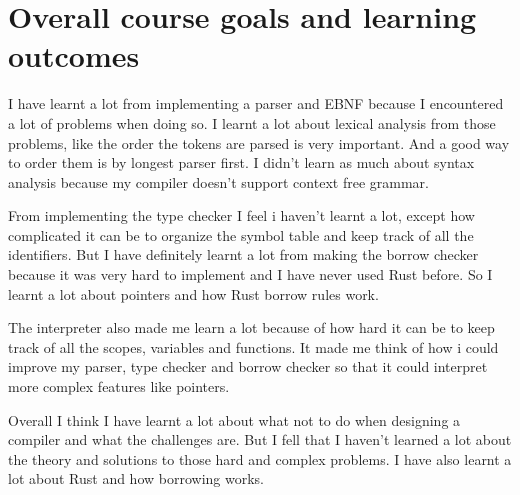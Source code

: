\documentclass[12pt]{article}
\begin{document}
    \section{Overall course goals and learning outcomes}
    	I have learnt a lot from implementing a parser and EBNF because I encountered a lot of problems when doing so. I learnt a lot about lexical analysis from those problems, like the order the tokens are parsed is very important. And a good way to order them is by longest parser first. I didn't learn as much about syntax analysis because my compiler doesn't support context free grammar.

	From implementing the type checker I feel i haven't learnt a lot, except how complicated it can be to organize the symbol table and keep track of all the identifiers. But I have definitely learnt a lot from making the borrow checker because it was very hard to implement and I have never used Rust before. So I learnt a lot about pointers and how Rust borrow rules work.

	The interpreter also made me learn a lot because of how hard it can be to keep track of all the scopes, variables and functions. It made me think of how i could improve my parser, type checker and borrow checker so that it could interpret more complex features like pointers.

	Overall I think I have learnt a lot about what not to do when designing a compiler and what the challenges are. But I fell that I haven't learned a lot about the theory and solutions to those hard and complex problems. I have also learnt a lot about Rust and how borrowing works.

	
\end{document}
